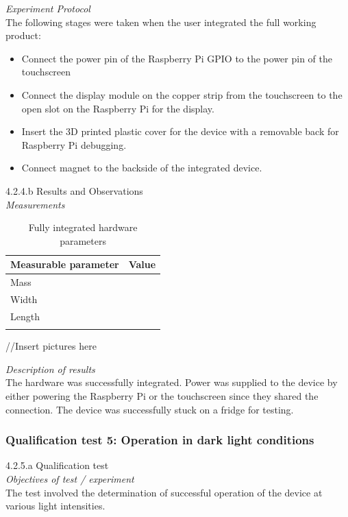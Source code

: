 \textit{Experiment Protocol}\\
The following stages were taken when the user integrated the full working product:
\begin{itemize}
	\item  Connect the power pin of the Raspberry Pi GPIO to the power pin of the touchscreen 
	\item  Connect the display module on the copper strip from the touchscreen to the open slot on the Raspberry Pi for the display.
	\item Insert the 3D printed plastic cover for the device with a removable back for Raspberry Pi debugging.
	\item Connect magnet to the backside of the integrated device.
	
\end{itemize}

4.2.4.b Results and Observations\\
\textit{Measurements}\\
\begin{center}
	\begin{longtable}{|p{5cm}|p{5cm}|}
		\hline
		\textbf{Measurable parameter} &
		\textbf{Value} \\
		\hline
		Mass
		&
		
		\\
		\hline
		Width
		&
		
		\\
		\hline
		Length
		&
		
		\\
		\hline		
		\caption{Fully integrated hardware parameters}
	\end{longtable}
\end{center}
//Insert pictures here

\textit{Description of results}\\
The hardware was successfully integrated. Power was supplied to the device by either powering the Raspberry Pi or the touchscreen since they shared the connection. The device was successfully stuck on a fridge for testing.

\subsubsection{Qualification test 5: Operation in dark light conditions}
4.2.5.a Qualification test\\
\textit{Objectives of test / experiment}\\
The test involved the determination of successful operation of the device at various light intensities.

